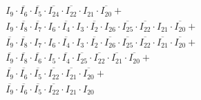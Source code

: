 \documentclass[a4paper,russian]{report}
\begin{document}
\begin{eqnarray*}
	& &  I_{9} \cdotp \overline{I_{6}} \cdotp \overline{I_{5}} \cdotp \overline{I_{24}} \cdotp \overline{I_{22}} \cdotp I_{21} \cdotp \overline{I_{20}} + \\
	& &  I_{9} \cdotp \overline{I_{8}} \cdotp \overline{I_{7}} \cdotp I_{6} \cdotp \overline{I_{4}} \cdotp I_{3} \cdotp \overline{I_{2}} \cdotp I_{26} \cdotp \overline{I_{25}} \cdotp \overline{I_{22}} \cdotp I_{21} \cdotp \overline{I_{20}} + \\
	& &  \overline{I_{9}} \cdotp \overline{I_{8}} \cdotp I_{7} \cdotp I_{6} \cdotp \overline{I_{4}} \cdotp I_{3} \cdotp \overline{I_{2}} \cdotp \overline{I_{26}} \cdotp \overline{I_{25}} \cdotp \overline{I_{22}} \cdotp \overline{I_{21}} \cdotp \overline{I_{20}} + \\
	& &  \overline{I_{9}} \cdotp \overline{I_{8}} \cdotp \overline{I_{6}} \cdotp I_{5} \cdotp \overline{I_{4}} \cdotp \overline{I_{25}} \cdotp \overline{I_{22}} \cdotp \overline{I_{21}} \cdotp \overline{I_{20}} + \\
	& &  \overline{I_{9}} \cdotp \overline{I_{6}} \cdotp \overline{I_{5}} \cdotp \overline{I_{22}} \cdotp \overline{I_{21}} \cdotp \overline{I_{20}} + \\
	& &  \overline{I_{9}} \cdotp \overline{I_{6}} \cdotp \overline{I_{5}} \cdotp \overline{I_{22}} \cdotp I_{21} \cdotp I_{20} \\
 \end{eqnarray*}
\pagebreak[1]
\end{document}
